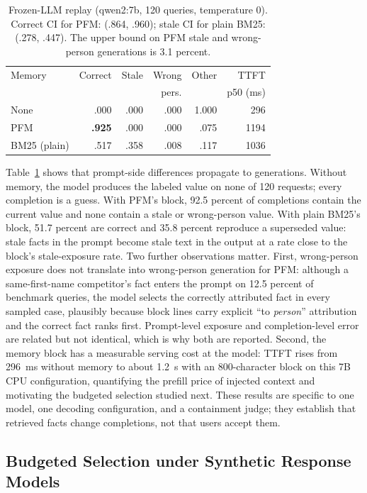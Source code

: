 \documentclass[letterpaper]{article} %
\begin{document}
\begin{table}[t]
\centering
\small
\begin{tabular}{@{}lrrrrr@{}}
\toprule
Memory & Correct & Stale & Wrong & Other & TTFT \\
 & & & pers. & & p50 (ms) \\
\midrule
None        & .000 & .000 & .000 & 1.000 & 296 \\
PFM         & \textbf{.925} & .000 & .000 & .075 & 1194 \\
BM25 (plain) & .517 & .358 & .008 & .117 & 1036 \\
\bottomrule
\end{tabular}
\caption{Frozen-LLM replay (qwen2:7b, 120 queries, temperature 0). Correct CI for PFM: (.864, .960); stale CI for plain BM25: (.278, .447). The upper bound on PFM stale and wrong-person generations is 3.1 percent.}
\label{tab:llm}
\end{table}

Table~\ref{tab:llm} shows that prompt-side differences propagate to generations. Without memory, the model produces the labeled value on none of 120 requests; every completion is a guess. With PFM's block, 92.5 percent of completions contain the current value and none contain a stale or wrong-person value. With plain BM25's block, 51.7 percent are correct and 35.8 percent reproduce a superseded value: stale facts in the prompt become stale text in the output at a rate close to the block's stale-exposure rate. Two further observations matter. First, wrong-person exposure does not translate into wrong-person generation for PFM: although a same-first-name competitor's fact enters the prompt on 12.5 percent of benchmark queries, the model selects the correctly attributed fact in every sampled case, plausibly because block lines carry explicit ``to \emph{person}'' attribution and the correct fact ranks first. Prompt-level exposure and completion-level error are related but not identical, which is why both are reported. Second, the memory block has a measurable serving cost at the model: TTFT rises from 296~ms without memory to about 1.2~s with an 800-character block on this 7B CPU configuration, quantifying the prefill price of injected context and motivating the budgeted selection studied next. These results are specific to one model, one decoding configuration, and a containment judge; they establish that retrieved facts change completions, not that users accept them.

\subsection{Budgeted Selection under Synthetic Response Models}
\end{document}
